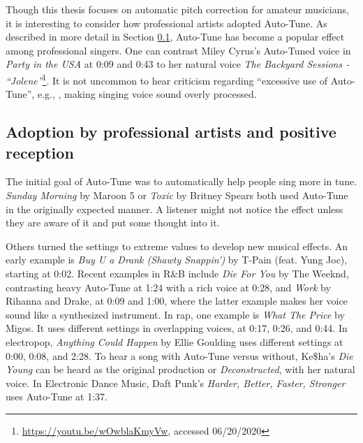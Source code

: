Though this thesis focuses on automatic pitch correction for amateur musicians, it is interesting to consider how professional artists adopted Auto-Tune. As described in more detail in Section \ref{sec:professional}, Auto-Tune has become a popular effect among professional singers. One can contrast Miley Cyrus's Auto-Tuned voice in \textit{Party in the USA} at 0:09 and 0:43 to her natural voice \textit{The Backyard Sessions - ``Jolene''}\footnote{\url{https://youtu.be/wOwblaKmyVw}, accessed 06/20/2020}. It is not uncommon to hear criticism regarding ``excessive use of Auto-Tune'', e.g., \cite{katz2014}, making singing voice sound overly processed. 

\subsection{Adoption by professional artists and positive reception}
\label{sec:professional}
The initial goal of Auto-Tune was to automatically help people sing more in tune. \textit{Sunday Morning} by Maroon 5 or \textit{Toxic} by Britney Spears both used Auto-Tune in the originally expected manner. A listener might not notice the effect unless they are aware of it and put some thought into it.

Others turned the settings to extreme values to develop new musical effects. An early example is \textit{Buy U a Drank (Shawty Snappin')} by T-Pain (feat. Yung Joc), starting at 0:02. Recent examples in R\&B include \textit{Die For You} by The Weeknd, contrasting heavy Auto-Tune at 1:24 with a rich voice at 0:28, and \textit{Work} by Rihanna and Drake, at 0:09 and 1:00, where the latter example makes her voice sound like a synthesized instrument. In rap, one example is \textit{What The Price} by Migos. It uses different settings in overlapping voices, at 0:17, 0:26, and 0:44. In electropop, \textit{Anything Could Happen} by Ellie Goulding uses different settings at 0:00, 0:08, and 2:28. To hear a song with Auto-Tune versus without, Ke\$ha's \textit{Die Young} can be heard as the original production or \textit{Deconstructed}, with her natural voice. In Electronic Dance Music, Daft Punk's \textit{Harder, Better, Faster, Stronger} uses Auto-Tune at 1:37. 

